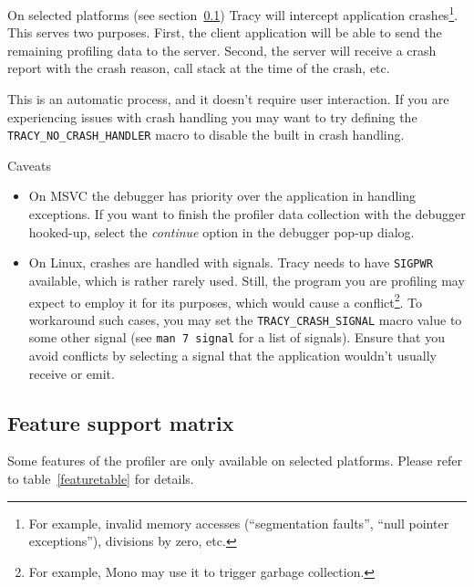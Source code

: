 \documentclass[hidelinks,titlepage,a4paper,twoside]{article}
\begin{document}
On selected platforms (see section~\ref{featurematrix}) Tracy will intercept application crashes\footnote{For example, invalid memory accesses (\enquote{segmentation faults}, \enquote{null pointer exceptions}), divisions by zero, etc.}. This serves two purposes. First, the client application will be able to send the remaining profiling data to the server. Second, the server will receive a crash report with the crash reason, call stack at the time of the crash, etc.

This is an automatic process, and it doesn't require user interaction. If you are experiencing issues with crash handling you may want to try defining the \texttt{TRACY\_NO\_CRASH\_HANDLER} macro to disable the built in crash handling.

\begin{bclogo}[
noborder=true,
couleur=black!5,
logo=\bcattention
]{Caveats}
\begin{itemize}
\item On MSVC the debugger has priority over the application in handling exceptions. If you want to finish the profiler data collection with the debugger hooked-up, select the \emph{continue} option in the debugger pop-up dialog.
\item On Linux, crashes are handled with signals. Tracy needs to have \texttt{SIGPWR} available, which is rather rarely used. Still, the program you are profiling may expect to employ it for its purposes, which would cause a conflict\footnote{For example, Mono may use it to trigger garbage collection.}. To workaround such cases, you may set the \texttt{TRACY\_CRASH\_SIGNAL} macro value to some other signal (see \texttt{man 7 signal} for a list of signals). Ensure that you avoid conflicts by selecting a signal that the application wouldn't usually receive or emit.
\end{itemize}
\end{bclogo}

\subsection{Feature support matrix}
\label{featurematrix}

Some features of the profiler are only available on selected platforms. Please refer to table~\ref{featuretable} for details.
\end{document}
